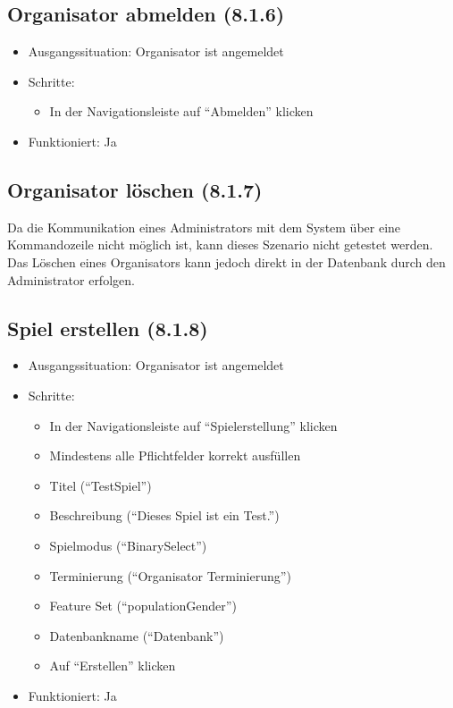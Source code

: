 \documentclass[a4paper]{scrreprt}
\begin{document}
            \subsection{Organisator abmelden (8.1.6)}
            \begin{itemize}
                \item Ausgangssituation: Organisator ist angemeldet
                \item Schritte:
                    \begin{itemize}
                        \item In der Navigationsleiste auf \enquote{Abmelden} klicken
                    \end{itemize}
                \item Funktioniert: Ja
            \end{itemize}

            \subsection{Organisator löschen (8.1.7)}
            Da die Kommunikation eines Administrators mit dem System über eine Kommandozeile nicht möglich ist, kann dieses Szenario nicht getestet werden.
            Das Löschen eines Organisators kann jedoch direkt in der Datenbank durch den Administrator erfolgen.

            \subsection{Spiel erstellen (8.1.8)}
            \begin{itemize}
                \item Ausgangssituation: Organisator ist angemeldet
                \item Schritte:
                    \begin{itemize}
                        \item In der Navigationsleiste auf \enquote{Spielerstellung} klicken
                        \item Mindestens alle Pflichtfelder korrekt ausfüllen
                        \item Titel (\enquote{TestSpiel})
                        \item Beschreibung (\enquote{Dieses Spiel ist ein Test.})
                        \item Spielmodus (\enquote{BinarySelect})
                        \item Terminierung (\enquote{Organisator Terminierung})
                        \item Feature Set (\enquote{populationGender})
                        \item Datenbankname (\enquote{Datenbank})
                        \item Auf \enquote{Erstellen} klicken
                    \end{itemize}
                \item Funktioniert: Ja
            \end{itemize}
\end{document}
